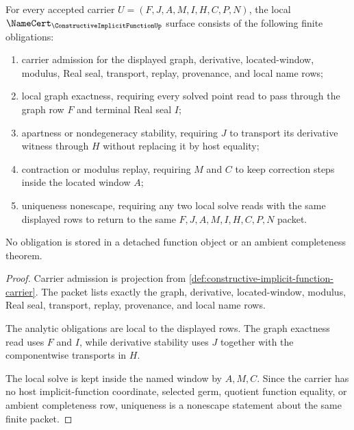\begin{theorem}
\label{thm:constructive-implicit-function-namecert-obligations}
For every accepted carrier $U=(F,J,A,M,I,H,C,P,N)$, the local $\NameCert_{\ConstructiveImplicitFunctionUp}$ surface consists of the following finite obligations:
\begin{enumerate}
\item carrier admission for the displayed graph, derivative, located-window, modulus, Real seal, transport, replay, provenance, and local name rows;
\item local graph exactness, requiring every solved point read to pass through the graph row $F$ and terminal Real seal $I$;
\item apartness or nondegeneracy stability, requiring $J$ to transport its derivative witness through $H$ without replacing it by host equality;
\item contraction or modulus replay, requiring $M$ and $C$ to keep correction steps inside the located window $A$;
\item uniqueness nonescape, requiring any two local solve reads with the same displayed rows to return to the same $F,J,A,M,I,H,C,P,N$ packet.
\end{enumerate}
No obligation is stored in a detached function object or an ambient completeness theorem.
\end{theorem}
\begin{proof}
Carrier admission is projection from \autoref{def:constructive-implicit-function-carrier}. The packet lists exactly the graph, derivative, located-window, modulus, Real seal, transport, replay, provenance, and local name rows.

The analytic obligations are local to the displayed rows. The graph exactness read uses $F$ and $I$, while derivative stability uses $J$ together with the componentwise transports in $H$.

The local solve is kept inside the named window by $A,M,C$. Since the carrier has no host implicit-function coordinate, selected germ, quotient function equality, or ambient completeness row, uniqueness is a nonescape statement about the same finite packet.
\end{proof}

